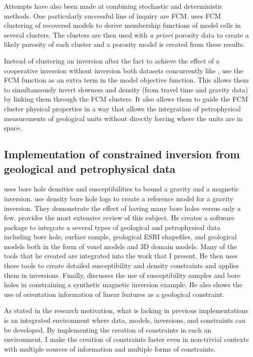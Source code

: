 Attempts have also been made at combining stochastic and deterministic methods. One particularly successful line of inquiry are \ac{FCM}. \cite{paasche2006integration} uses FCM clustering of recovered models to derive membership functions of model cells in several clusters. The clusters are then used with \emph{a priori} porosity data to create a likely porosity of each cluster and a porosity model is created from these results. 

Instead of clustering an inversion after the fact to achieve the effect of a cooperative inversion without inversion both datasets concurrently like \cite{paasche2006integration}, \cite{sun2015multidomain} use the FCM function as an extra term in the model objective function. This allows them to simultaneously invert slowness and density (from travel time and gravity data) by linking them through the FCM clusters. It also allows them to guide the FCM cluster physical properties in a way that allows the integration of petrophysical measurements of geological units without directly forcing where the units are in space.

\subsection{Implementation of constrained inversion from geological and petrophysical data}
\label{subsec:litrevImplementation}

\cite{phillips2001thesis} uses bore hole densities and susceptibilities to bound a gravity and a magnetic inversion. \cite{farquharson2008geologically} use density bore hole logs to create a reference model for a gravity inversion. They demonstrate the effect of having many bore holes versus only a few. \cite{williams2008geologically}  provides the most extensive review of this subject. He creates a software package to integrate a several types of geological and petrophysical data including bore hole, surface sample, geological ESRI shapefiles, and geological models both in the form of voxel models and 3D domain models. Many of the tools that he created are integrated into the work that I present. He then uses these tools to create detailed susceptibility and density constraints and applies them in inversions. Finally, \cite{Lelievre2009Integrating} discusses the use of susceptibility samples and bore holes in constraining a synthetic magnetic inversion example. He also shows the use of orientation information of linear features as a geological constraint. 

As stated in the research motivation, what is lacking in previous implementations is an integrated environment where data, models, inversions, and constraints can be developed. By implementing the creation of constraints in such an environment, I make the creation of constraints faster even in non-trivial contexts with multiple sources of information and multiple forms of constraints.

